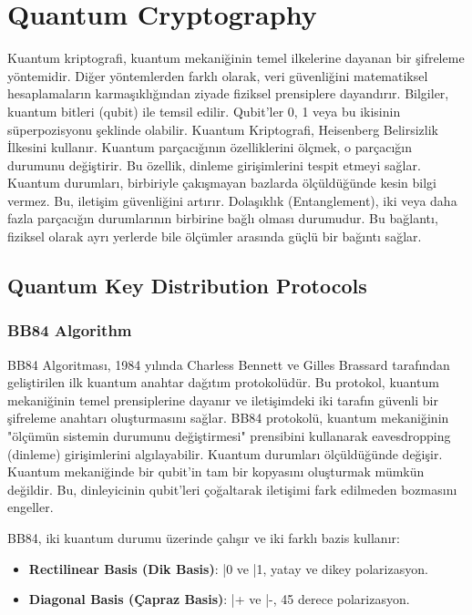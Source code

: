 \section{Quantum Cryptography}

Kuantum kriptografi, kuantum mekaniğinin temel ilkelerine dayanan bir şifreleme yöntemidir. Diğer yöntemlerden farklı olarak, veri güvenliğini matematiksel hesaplamaların karmaşıklığından ziyade fiziksel prensiplere dayandırır. Bilgiler, kuantum bitleri (qubit) ile temsil edilir. Qubit'ler 0, 1 veya bu ikisinin süperpozisyonu şeklinde olabilir. Kuantum Kriptografi, Heisenberg Belirsizlik İlkesini kullanır. Kuantum parçacığının özelliklerini ölçmek, o parçacığın durumunu değiştirir. Bu özellik, dinleme girişimlerini tespit etmeyi sağlar. Kuantum durumları, birbiriyle çakışmayan bazlarda ölçüldüğünde kesin bilgi vermez. Bu, iletişim güvenliğini artırır. Dolaşıklık (Entanglement), iki veya daha fazla parçacığın durumlarının birbirine bağlı olması durumudur. Bu bağlantı, fiziksel olarak ayrı yerlerde bile ölçümler arasında güçlü bir bağıntı sağlar.

\subsection{Quantum Key Distribution Protocols}

\subsubsection{BB84 Algorithm}

BB84 Algoritması, 1984 yılında Charless Bennett ve Gilles Brassard tarafından geliştirilen ilk kuantum anahtar dağıtım protokolüdür. Bu protokol, kuantum mekaniğinin temel prensiplerine dayanır ve iletişimdeki iki tarafın güvenli bir şifreleme anahtarı oluşturmasını sağlar. BB84 protokolü, kuantum mekaniğinin "ölçümün sistemin durumunu değiştirmesi" prensibini kullanarak eavesdropping (dinleme) girişimlerini algılayabilir. Kuantum durumları ölçüldüğünde değişir. Kuantum mekaniğinde bir qubit'in tam bir kopyasını oluşturmak mümkün değildir. Bu, dinleyicinin qubit'leri çoğaltarak iletişimi fark edilmeden bozmasını engeller.

BB84, iki kuantum durumu üzerinde çalışır ve iki farklı bazis kullanır:

\begin{itemize}
    \item \textbf{Rectilinear Basis (Dik Basis)}: |0 ve |1, yatay ve dikey polarizasyon.
    \item \textbf{Diagonal Basis (Çapraz Basis)}: |+ ve |-, 45 derece polarizasyon.
\end{itemize}


